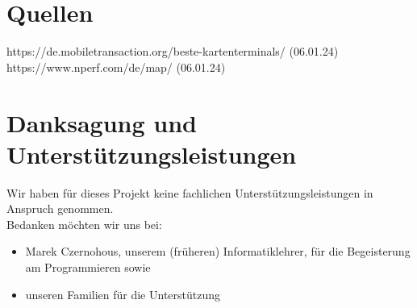 \documentclass[a4paper,12pt,ngerman]{scrreport}
\begin{document}
    \chapter{Quellen}
    https://de.mobiletransaction.org/beste-kartenterminals/ (06.01.24)
    https://www.nperf.com/de/map/ (06.01.24)

    \chapter{Danksagung und Unterstützungsleistungen}
    Wir haben für dieses Projekt keine fachlichen Unterstützungsleistungen in Anspruch genommen.\\
    Bedanken möchten wir uns bei:
    \begin{itemize}
        \item Marek Czernohous, unserem (früheren) Informatiklehrer, für die Begeisterung am Programmieren sowie
        \item unseren Familien für die Unterstützung
    \end{itemize}
\end{document}
